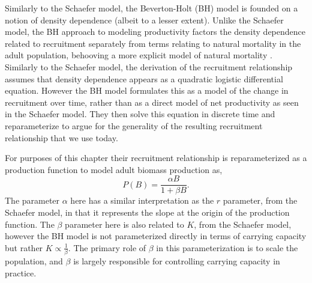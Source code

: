 %
%
%
Similarly to the Schaefer model, the Beverton-Holt (BH) model 
\cite{beverton_dynamics_1957} is founded on a notion of density 
dependence \cite{gotelli_primer_1995} (albeit to a lesser extent). 
Unlike the Schaefer model, the BH approach to modeling productivity factors the 
density dependence related to recruitment separately from terms relating to 
natural mortality in the adult population, behooving a more explicit model of 
natural mortality \cite{beverton_review_1959}.
Similarly to the Schaefer model, the derivation of the recruitment 
relationship assumes that density dependence appears as a quadratic logistic 
differential equation. However the BH model formulates this as a model of the 
change in recruitment over time, rather than as a direct model of net productivity 
as seen in the Schaefer model. They then solve this equation in discrete time 
and reparameterize to argue for the generality of the resulting recruitment 
relationship that we use today. 

%
For purposes of this chapter their recruitment relationship is reparameterized 
as a production function to model adult biomass production as, %
%
\begin{equation}
P(B) = \frac{\alpha B}{1+\beta B}.
\end{equation}
%
The parameter $\alpha$ here has a similar interpretation as the $r$ parameter, 
from the Schaefer model, in that it represents the slope at the origin of the 
production function. The $\beta$ parameter here is also related to $K$, 
from the Schaefer model, however the BH model is not parameterized 
directly in terms of carrying capacity but rather $K\propto\frac{1}{\beta}$. 
The primary role of $\beta$ in this parameterization is to scale the 
population, and $\beta$ is largely responsible for controlling carrying capacity 
in practice. 

